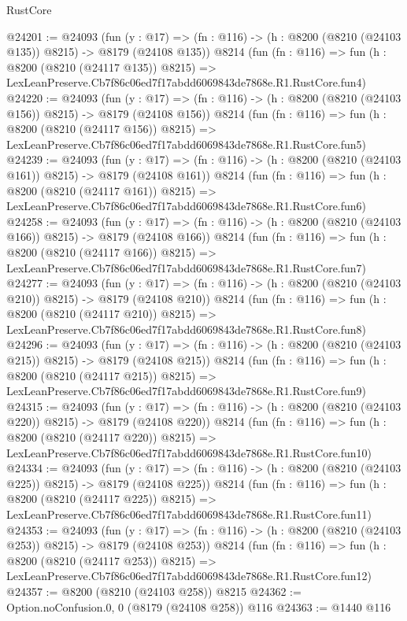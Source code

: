 \begin{lexlean}{RustCore}
\begin{coremodule}
@24201 := @24093
    (fun (y : @17) => (fn : @116) -> (h : @8200 (@8210 (@24103 @135)) @8215) -> @8179 (@24108 @135))
    @8214
    (fun (fn : @116) =>
    fun (h : @8200 (@8210 (@24117 @135)) @8215) =>
    LexLeanPreserve.Cb7f86c06ed7f17abdd6069843de7868e.R1.RustCore.fun4)
@24220 := @24093
    (fun (y : @17) => (fn : @116) -> (h : @8200 (@8210 (@24103 @156)) @8215) -> @8179 (@24108 @156))
    @8214
    (fun (fn : @116) =>
    fun (h : @8200 (@8210 (@24117 @156)) @8215) =>
    LexLeanPreserve.Cb7f86c06ed7f17abdd6069843de7868e.R1.RustCore.fun5)
@24239 := @24093
    (fun (y : @17) => (fn : @116) -> (h : @8200 (@8210 (@24103 @161)) @8215) -> @8179 (@24108 @161))
    @8214
    (fun (fn : @116) =>
    fun (h : @8200 (@8210 (@24117 @161)) @8215) =>
    LexLeanPreserve.Cb7f86c06ed7f17abdd6069843de7868e.R1.RustCore.fun6)
@24258 := @24093
    (fun (y : @17) => (fn : @116) -> (h : @8200 (@8210 (@24103 @166)) @8215) -> @8179 (@24108 @166))
    @8214
    (fun (fn : @116) =>
    fun (h : @8200 (@8210 (@24117 @166)) @8215) =>
    LexLeanPreserve.Cb7f86c06ed7f17abdd6069843de7868e.R1.RustCore.fun7)
@24277 := @24093
    (fun (y : @17) => (fn : @116) -> (h : @8200 (@8210 (@24103 @210)) @8215) -> @8179 (@24108 @210))
    @8214
    (fun (fn : @116) =>
    fun (h : @8200 (@8210 (@24117 @210)) @8215) =>
    LexLeanPreserve.Cb7f86c06ed7f17abdd6069843de7868e.R1.RustCore.fun8)
@24296 := @24093
    (fun (y : @17) => (fn : @116) -> (h : @8200 (@8210 (@24103 @215)) @8215) -> @8179 (@24108 @215))
    @8214
    (fun (fn : @116) =>
    fun (h : @8200 (@8210 (@24117 @215)) @8215) =>
    LexLeanPreserve.Cb7f86c06ed7f17abdd6069843de7868e.R1.RustCore.fun9)
@24315 := @24093
    (fun (y : @17) => (fn : @116) -> (h : @8200 (@8210 (@24103 @220)) @8215) -> @8179 (@24108 @220))
    @8214
    (fun (fn : @116) =>
    fun (h : @8200 (@8210 (@24117 @220)) @8215) =>
    LexLeanPreserve.Cb7f86c06ed7f17abdd6069843de7868e.R1.RustCore.fun10)
@24334 := @24093
    (fun (y : @17) => (fn : @116) -> (h : @8200 (@8210 (@24103 @225)) @8215) -> @8179 (@24108 @225))
    @8214
    (fun (fn : @116) =>
    fun (h : @8200 (@8210 (@24117 @225)) @8215) =>
    LexLeanPreserve.Cb7f86c06ed7f17abdd6069843de7868e.R1.RustCore.fun11)
@24353 := @24093
    (fun (y : @17) => (fn : @116) -> (h : @8200 (@8210 (@24103 @253)) @8215) -> @8179 (@24108 @253))
    @8214
    (fun (fn : @116) =>
    fun (h : @8200 (@8210 (@24117 @253)) @8215) =>
    LexLeanPreserve.Cb7f86c06ed7f17abdd6069843de7868e.R1.RustCore.fun12)
@24357 := @8200 (@8210 (@24103 @258)) @8215
@24362 := Option.noConfusion.{0, 0} (@8179 (@24108 @258)) @116
@24363 := @1440 @116

\end{coremodule}
\end{lexlean}
